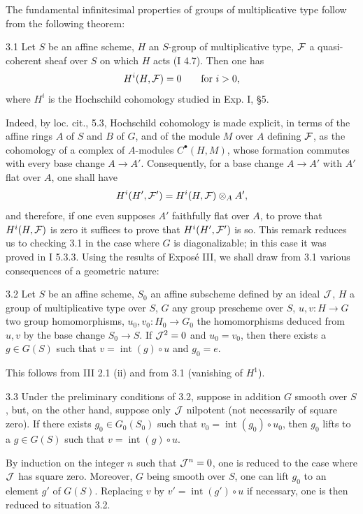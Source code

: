 The fundamental infinitesimal properties of groups of multiplicative type follow from the following theorem:
\begin{theorem}{3.1}\label{IX.3.1}
Let $S$ be an affine scheme, $H$ an $S$-group of multiplicative type, $\cal F$ a quasi-coherent sheaf over $S$ on which $H$ acts (I 4.7). Then one has
\[
H^i(H,\cal F)=0\qquad\text{for }i>0,
\]
where $H^i$ is the Hochschild cohomology studied in Exp. I, \S5.
\end{theorem}
Indeed, by loc. cit., 5.3, Hochschild cohomology is made explicit, in terms of the affine rings $A$ of $S$ and $B$ of $G$, and of the module $M$ over $A$ defining $\cal F$, as the cohomology of a complex of $A$-modules $C^\bullet(H,M)$, whose formation commutes with every base change $A\to A'$. Consequently, for a base change $A\to A'$ with $A'$ flat over $A$, one shall have
\[
H^i(H',\cal F')=H^i(H,\cal F)\otimes_A A',
\]
and therefore, if one even supposes $A'$ faithfully flat over $A$, to prove that $H^i(H,\cal F)$ is zero it suffices to prove that $H^i(H',\cal F')$ is so. This remark reduces us to checking 3.1 in the case where $G$ is diagonalizable; in this case it was proved in I 5.3.3.
Using the results of Expos\'e III, we shall draw from 3.1 various consequences of a geometric nature:
\begin{theorem}{3.2}\label{IX.3.2}
Let $S$ be an affine scheme, $S_0$ an affine subscheme defined by an ideal $\cal J$, $H$ a group of multiplicative type over $S$, $G$ any group prescheme over $S$, $u,v:H\to G$ two group homomorphisms, $u_0,v_0:H_0\to G_0$ the homomorphisms deduced from $u,v$ by the base change $S_0\to S$. If $\cal J^2=0$ and $u_0=v_0$, then there exists a $g\in G(S)$ such that $v=\operatorname{int}(g)\circ u$ and $g_0=e$.
\end{theorem}
This follows from III 2.1 (ii) and from 3.1 (vanishing of $H^1$).
\begin{corollary}{3.3}\label{IX.3.3}
Under the preliminary conditions of 3.2, suppose in addition $G$ smooth over $S$, but, on the other hand, suppose only $\cal J$ nilpotent (not necessarily of square zero). If there exists $g_0\in G_0(S_0)$ such that $v_0=\operatorname{int}(g_0)\circ u_0$, then $g_0$ lifts to a $g\in G(S)$ such that $v=\operatorname{int}(g)\circ u$.
\end{corollary}
By induction on the integer $n$ such that $\cal J^n=0$, one is reduced to the case where $\cal J$ has square zero. Moreover, $G$ being smooth over $S$, one can lift $g_0$ to an element $g'$ of $G(S)$. Replacing $v$ by $v'=\operatorname{int}(g')\circ u$ if necessary, one is then reduced to situation 3.2.
